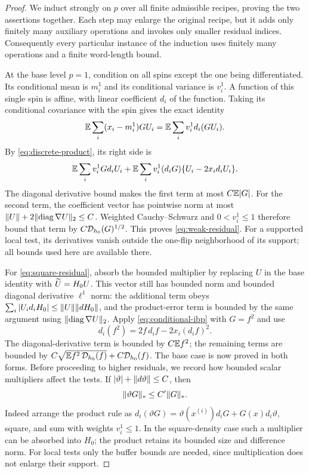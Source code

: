 \begin{proof}
We induct strongly on $p$ over all finite admissible recipes, proving
the two assertions together. Each step may enlarge the original recipe,
but it adds only finitely many auxiliary operations and invokes only
smaller residual indices. Consequently every particular instance of the
induction uses finitely many operations and a finite word-length bound.

At the base level $p=1$, condition on all spins except the one being
differentiated. Its conditional mean is $m_i^1$ and its conditional
variance is $v_i^1$. A function of this single spin is affine, with linear
coefficient $d_i$ of the function. Taking its conditional covariance
with the spin gives the exact identity
\begin{equation}
 \mathbb E\sum_i(x_i-m_i^1)GU_i
       =\mathbb E\sum_i v_i^1d_i(GU_i).
 \label{eq:conditional-ibp}
\end{equation}
By \eqref{eq:discrete-product}, its right side is
\[
 \mathbb E\sum_i v_i^1Gd_iU_i
   +\mathbb E\sum_i v_i^1(d_iG)\{U_i-2x_id_iU_i\}.
\]
The diagonal derivative bound makes the first term at most $C\mathbb E|G|$.
For the second term, the coefficient vector has pointwise norm at most
$\lVert U\rVert+2\lVert \operatorname{diag}\nabla U\rVert_2\leq C$.
Weighted Cauchy--Schwarz and $0<v_i^1\leq1$ therefore bound that term
by $C\mathcal D_{h_0}(G)^{1/2}$.  This proves \eqref{eq:weak-residual}.
For a supported local test, its derivatives vanish outside the one-flip
neighborhood of its support; all bounds used here are available there.

For \eqref{eq:square-residual}, absorb the bounded multiplier by replacing
$U$ in the base identity with $\widetilde U=H_0U$. This vector still has bounded
norm and bounded diagonal derivative
$\ell^1$ norm: the additional term obeys
$\sum_i|U_i d_iH_0|\leq\lVert U\rVert\lVert dH_0\rVert$, and the product-error
term is bounded by the same argument using
$\lVert \operatorname{diag}\nabla U\rVert_2$.  Apply \eqref{eq:conditional-ibp} with
$G=f^2$ and use
\[
 d_i(f^2)=2f\,d_i f-2x_i(d_i f)^2.
\]
The diagonal-derivative term is bounded by $C\mathbb E f^2$; the remaining
terms are bounded by
$C\sqrt{\mathbb E f^2\,\mathcal D_{h_0}(f)}+C\mathcal D_{h_0}(f)$.
The base case is now proved in both forms. Before proceeding to higher
residuals, we record how bounded scalar multipliers affect the tests. If
$|\vartheta|+\lVert d\vartheta\rVert\leq C$, then
\begin{equation}
 \lVert \vartheta G\rVert_*\leq C'\lVert G\rVert_*.
 \label{eq:star-multiplier}
\end{equation}
Indeed arrange the product rule as
$d_i(\vartheta G)=\vartheta(x^{(i)})d_iG+G(x)d_i\vartheta$,
square, and sum with weights $v_i^1\leq1$.  In the square-density
case such a multiplier can be absorbed into $H_0$; the product retains
its bounded size and difference norm.  For local tests only the buffer
bounds are needed, since multiplication does not enlarge their support.


\end{proof}
